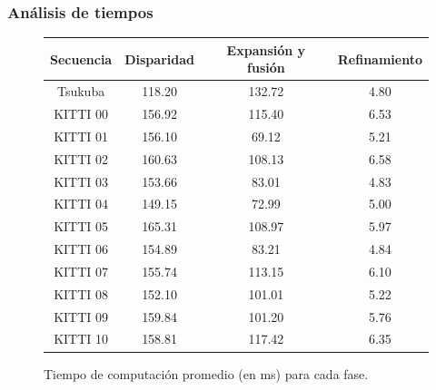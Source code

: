 \documentclass[compress]{beamer}
\begin{document}
\begin{frame}
	\frametitle{Análisis de tiempos}
	\vspace{-0.7em}
	\begin{center}
	\begin{figure}[tbh]
	\begin{centering}
	\begin{tabular}{cccc}
		\toprule 
		Secuencia & Disparidad & Expansión y fusión & Refinamiento\tabularnewline
		\midrule
		\midrule 
		Tsukuba & 118.20 & 132.72 & 4.80\tabularnewline
		\midrule 
		KITTI 00 & 156.92 & 115.40 & 6.53\tabularnewline
		\midrule 
		KITTI 01 & 156.10 & 69.12 & 5.21\tabularnewline
		\midrule 
		KITTI 02 & 160.63 & 108.13 & 6.58\tabularnewline
		\midrule 
		KITTI 03 & 153.66 & 83.01 & 4.83\tabularnewline
		\midrule 
		KITTI 04 & 149.15 & 72.99 & 5.00\tabularnewline
		\midrule 
		KITTI 05 & 165.31 & 108.97 & 5.97\tabularnewline
		\midrule 
		KITTI 06 & 154.89 & 83.21 & 4.84\tabularnewline
		\midrule 
		KITTI 07 & 155.74 & 113.15 & 6.10\tabularnewline
		\midrule 
		KITTI 08 & 152.10 & 101.01 & 5.22\tabularnewline
		\midrule 
		KITTI 09 & 159.84 & 101.20 & 5.76\tabularnewline
		\midrule 
		KITTI 10 & 158.81 & 117.42 & 6.35\tabularnewline
		\bottomrule
	\end{tabular}
	\par\end{centering}
	\centering
	\caption{Tiempo de computación promedio (en ms) para cada fase.}
	\end{figure}
	\par\end{center}
\end{frame}

\end{document}
